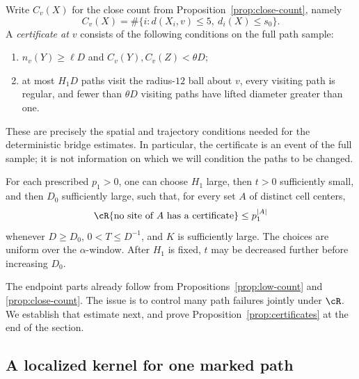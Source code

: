 Write $C_v(X)$ for the close count from
Proposition~\ref{prop:close-count}, namely
\[
 C_v(X)=\#\{i:d(X_i,v)\le5,\ d_i(X)\le s_0\}.
\]
A \emph{certificate at $v$} consists of the following conditions
on the full path sample:
\begin{enumerate}
 \item $n_v(Y)\ge\ell D$ and $C_v(Y),C_v(Z)<\theta D$;
 \item at most $H_1D$ paths visit the radius-$12$ ball about
 $v$, every visiting path is regular, and fewer than
 $\theta D$ visiting paths have lifted diameter greater than one.
\end{enumerate}
These are precisely the spatial and trajectory conditions needed
for the deterministic bridge estimates.  In particular, the
certificate is an event of the full sample; it is not information
on which we will condition the paths to be changed.

\begin{proposition}\label{prop:certificates}
For each prescribed $p_1>0$, one can choose $H_1$ large,
then $t>0$ sufficiently small, and then $D_0$ sufficiently
large, such that, for every set $A$ of distinct cell centers,
\begin{equation}\label{eq:joint-certificates}
 \cR\{\text{no site of }A\text{ has a certificate}\}
 \le p_1^{|A|}
\end{equation}
whenever $D\ge D_0$, $0<T\le D^{-1}$, and $K$ is
sufficiently large.  The choices are uniform over the
$\alpha$-window.  After $H_1$ is fixed, $t$ may be decreased
further before increasing $D_0$.
\end{proposition}

The endpoint parts already follow from
Propositions~\ref{prop:low-count} and \ref{prop:close-count}.
The issue is to control many path failures jointly under
$\cR$.  We establish that estimate next, and prove
Proposition~\ref{prop:certificates} at the end of the section.

\subsection{A localized kernel for one marked path}

